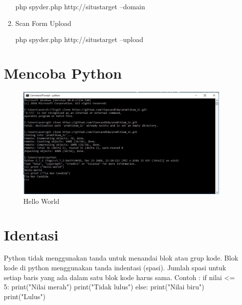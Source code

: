 \documentclass[lipt]{Article}
\begin{document}
\begin{enumerate}
\begin{enumerate}
php spyder.php http://situstarget –domain
\item
Scan Form Upload

php spyder.php http://situstarget –upload
\end{enumerate}
\section{Mencoba Python}
\begin{figure}[!htbp]
\centering
\includegraphics{hello world.jpg}
\caption{ Hello World }
\label{Hello World}
\end{figure}

\section{Identasi}
Python tidak menggunakan tanda { } untuk menandai blok atau grup kode. Blok kode di python menggunakan tanda indentasi (spasi). Jumlah spasi untuk setiap baris yang ada dalam satu blok kode harus sama.
Contoh :
if nilai <= 5:
   print("Nilai merah")
   print("Tidak lulus")
else:
   print("Nilai biru")
   print("Lulus")


\end{enumerate}
\end{document}
